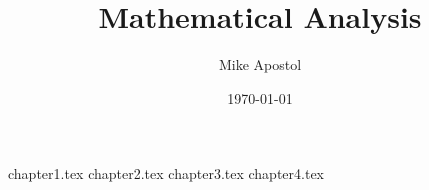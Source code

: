 \documentclass{mike-apostol-mathematical-analysis}
\title{Mathematical Analysis}
\author{Mike Apostol}
\date{\today}
\begin{document}
\maketitle

\tableofcontents

{chapter1.tex}
{chapter2.tex}
{chapter3.tex}
{chapter4.tex}
\end{document}
